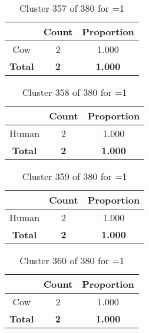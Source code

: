 \begin{table}[ht!]
\centering
\begin{tabular}{|c|c|c|}
\hline
\bf \Spec{} &\bf Count &\bf Proportion\\ \hline \hline
Cow & 2 & 1.000\\ \hline
\hline
\bf Total & \bf 2 & \bf 1.000\\ \hline
\end{tabular}
\label{tab:cluster:357:1}
\caption{Cluster 357 of 380 for \minneigh{}=1}
\end{table}

\begin{table}[ht!]
\centering
\begin{tabular}{|c|c|c|}
\hline
\bf \Spec{} &\bf Count &\bf Proportion\\ \hline \hline
Human & 2 & 1.000\\ \hline
\hline
\bf Total & \bf 2 & \bf 1.000\\ \hline
\end{tabular}
\label{tab:cluster:358:1}
\caption{Cluster 358 of 380 for \minneigh{}=1}
\end{table}

\begin{table}[ht!]
\centering
\begin{tabular}{|c|c|c|}
\hline
\bf \Spec{} &\bf Count &\bf Proportion\\ \hline \hline
Human & 2 & 1.000\\ \hline
\hline
\bf Total & \bf 2 & \bf 1.000\\ \hline
\end{tabular}
\label{tab:cluster:359:1}
\caption{Cluster 359 of 380 for \minneigh{}=1}
\end{table}

\clearpage
\begin{table}[ht!]
\centering
\begin{tabular}{|c|c|c|}
\hline
\bf \Spec{} &\bf Count &\bf Proportion\\ \hline \hline
Cow & 2 & 1.000\\ \hline
\hline
\bf Total & \bf 2 & \bf 1.000\\ \hline
\end{tabular}
\label{tab:cluster:360:1}
\caption{Cluster 360 of 380 for \minneigh{}=1}
\end{table}

